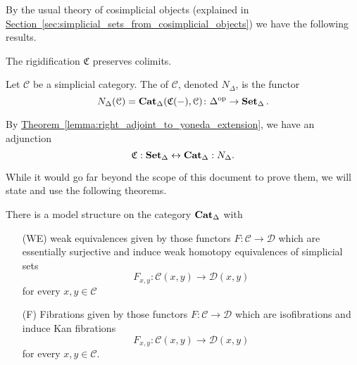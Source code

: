 By the usual theory of cosimplicial objects (explained in \hyperref[sec:simplicial_sets_from_cosimplicial_objects]{Section~\ref*{sec:simplicial_sets_from_cosimplicial_objects}}) we have the following results.

\begin{lemma}
	\label{lemma:thickening_preserves_colimits}
	The rigidification $\mathfrak{C}$ preserves colimits.
\end{lemma}

\begin{definition}
	\label{def:homotopy-coherent_nerve}
	Let $\mathcal{C}$ be a simplicial category. The  of $\mathcal{C}$, denoted $N_{\Delta}$, is the functor
	\begin{equation*}
	N_{\Delta}(\mathcal{C}) = \mathbf{Cat}_{\Delta}(\mathfrak{C}(-), \mathcal{C})\colon \Delta^{\mathrm{op}} \to \operatorname{\mathbf{Set}_{\Delta}}.
	\end{equation*}
\end{definition}

By \hyperref[lemma:right_adjoint_to_yoneda_extension]{Theorem~\ref*{lemma:right_adjoint_to_yoneda_extension}}, we have an adjunction
\begin{equation*}
\mathfrak{C} : \operatorname{\mathbf{Set}_{\Delta}} \leftrightarrow \operatorname{\mathbf{Cat}_{\Delta}} : N_{\Delta}.
\end{equation*}

While it would go far beyond the scope of this document to prove them, we will state and use the following theorems. 

\begin{theorem}[Bergner]
	There is a model structure on the category $\operatorname{\mathbf{Cat}_{\Delta}}$ with 
	\begin{itemize}
		\item[(WE)] weak equivalences given by those functors $F:\mathcal{C}\to \mathcal{D}$ which are essentially surjective and induce weak homotopy equivalences of simplicial sets 
		\[
		F_{x,y}:\mathcal{C}(x,y)\to \mathcal{D}(x,y)
		\]
		for every $x,y\in \mathcal{C}$
		\item[(F)] Fibrations given by those functors $F:\mathcal{C}\to \mathcal{D}$ which are isofibrations and induce Kan fibrations 
		\[
		F_{x,y}:\mathcal{C}(x,y)\to \mathcal{D}(x,y)
		\]
		for every $x,y\in \mathcal{C}$.
	\end{itemize}
\end{theorem}

